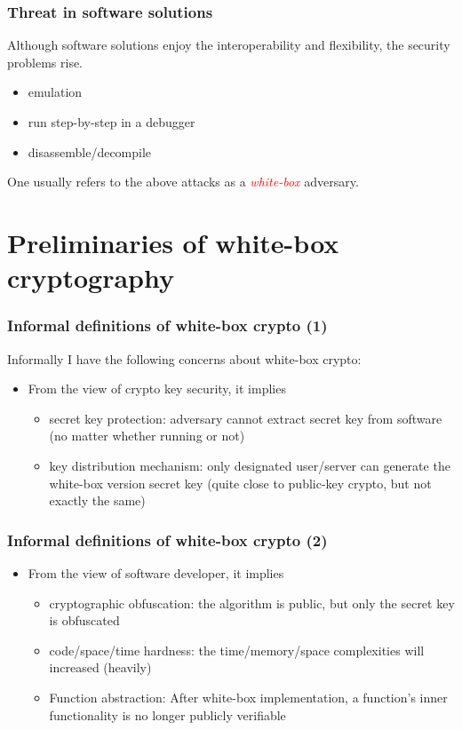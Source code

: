 \documentclass{beamer}
\begin{document}
\frame
{
\frametitle{Threat in software solutions}
Although software solutions enjoy the interoperability and flexibility, the security problems rise.
\begin{itemize}
\setlength{\itemsep}{12pt}
\item emulation
\item run step-by-step in a debugger
\item disassemble/decompile
\end{itemize}

One usually refers to the above attacks as a \textcolor{red}{\textit{white-box}} adversary.
}

\section{Preliminaries of white-box cryptography}
\frame
{
\frametitle{Informal definitions of white-box crypto (1)}
Informally I have the following concerns about white-box crypto:
\begin{itemize}
\setlength{\itemsep}{12pt}
\item From the view of crypto key security, it implies
\begin{itemize}
\setlength{\itemsep}{12pt}
\item secret key protection: adversary cannot extract secret key from software (no matter whether running or not)

\item key distribution mechanism: only designated user/server can generate the white-box version secret key (quite close to public-key crypto, but not exactly the same)

\end{itemize}
\end{itemize}
}

\frame
{
\frametitle{Informal definitions of white-box crypto (2)}
\begin{itemize}
\setlength{\itemsep}{12pt}
\item From the view of software developer, it implies
\begin{itemize}
\setlength{\itemsep}{12pt}
\item cryptographic obfuscation: the algorithm is public, but only the secret key is obfuscated

\item code/space/time hardness: the time/memory/space complexities will increased (heavily)

\item Function abstraction: After white-box implementation, a function's inner functionality is no longer publicly verifiable
\end{itemize}
\end{itemize}

}
\end{document}
